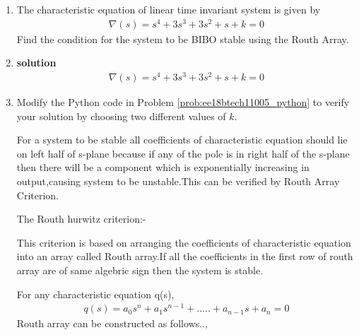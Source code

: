 \begin{enumerate}[label=\thesubsection.\arabic*.,ref=\thesubsection.\theenumi]
\item 
The characteristic equation of linear time invariant system is given by
\begin{align} 
\nabla(s)=s^4+3s^3+3s^2+s+k=0
\end{align}
Find the condition for the system to be BIBO stable using the Routh Array.

\item \textbf{solution}
\begin{align}
\nabla(s)=s^4+3s^3+3s^2+s+k=0
\end{align}

\item Modify the Python code in Problem \ref{prob:ee18btech11005_python} to verify your solution by choosing two different values of $k$.

For a system to be stable all coefficients of characteristic equation should lie on left half of s-plane because if any of the pole is in right half of the s-plane then there will be a component which is exponentially increasing in output,causing system to be unstable.This can be verified by Routh Array Criterion.


The Routh hurwitz criterion:-


This criterion is based on arranging the coefficients of characteristic equation into an array called Routh array.If all the coefficients in the first row of routh array are of same algebric sign then the system is stable.


For any characteristic equation q(s),
\begin{multline}
q(s) = a_0s^n+a_1s^{n-1}+.....+a_{n-1}s+a_n = 0
\end{multline}
Routh array can be constructed as follows..,
 

\end{enumerate}
